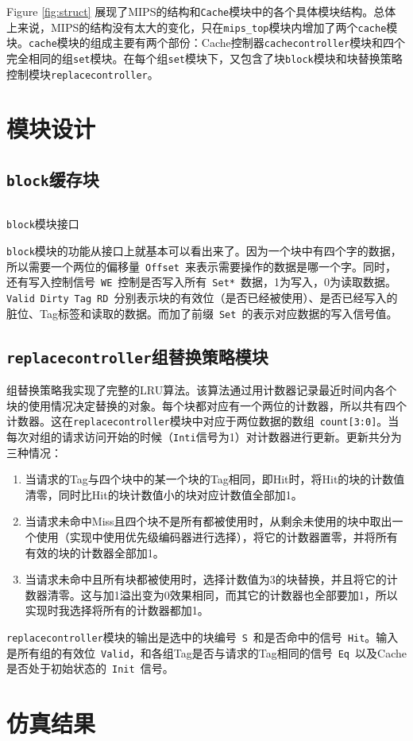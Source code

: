 \documentclass[12pt,a4paper]{article}
\newcommand{\incode}[1]{\texttt{#1}} %
\newcommand{\codefile}[1]{\inputminted[bgcolor=bg,linenos,tabsize=4]{verilog}{code/#1}} %
\begin{document}
Figure \ref{fig:struct} 展现了MIPS的结构和\incode{Cache}模块中的各个具体模块结构。总体上来说，MIPS的结构没有太大的变化，只在\incode{mips_top}模块内增加了两个\incode{cache}模块。\incode{cache}模块的组成主要有两个部份：Cache控制器\incode{cachecontroller}模块和四个完全相同的组\incode{set}模块。在每个组\incode{set}模块下，又包含了块\incode{block}模块和块替换策略控制模块\incode{replacecontroller}。

\section{模块设计}

\subsection{\incode{block}缓存块}

\begin{listing}[h]
	\codefile{block.v}
	\caption{\incode{block}模块接口}
	\label{code:block}
\end{listing}

\incode{block}模块的功能从接口上就基本可以看出来了。因为一个块中有四个字的数据，所以需要一个两位的偏移量\ \incode{Offset}\ 来表示需要操作的数据是哪一个字。同时，还有写入控制信号\ \incode{WE}\ 控制是否写入所有\ \incode{Set*}\ 数据，1为写入，0为读取数据。\incode{Valid}\ \incode{Dirty}\ \incode{Tag}\ \incode{RD}\ 分别表示块的有效位（是否已经被使用）、是否已经写入的脏位、Tag标签和读取的数据。而加了前缀\ \incode{Set}\ 的表示对应数据的写入信号值。

\subsection{\incode{replacecontroller}组替换策略模块}

组替换策略我实现了完整的LRU算法。该算法通过用计数器记录最近时间内各个块的使用情况决定替换的对象。每个块都对应有一个两位的计数器，所以共有四个计数器。这在\incode{replacecontroller}模块中对应于两位数据的数组\ \incode{count[3:0]}。当每次对组的请求访问开始的时候（\incode{Inti}信号为1）对计数器进行更新。更新共分为三种情况：
\begin{enumerate}
  \item 当请求的Tag与四个块中的某一个块的Tag相同，即Hit时，将Hit的块的计数值清零，同时比Hit的块计数值小的块对应计数值全部加1。
  \item 当请求未命中Miss且四个块不是所有都被使用时，从剩余未使用的块中取出一个使用（实现中使用优先级编码器进行选择），将它的计数器置零，并将所有有效的块的计数器全部加1。
  \item 当请求未命中且所有块都被使用时，选择计数值为3的块替换，并且将它的计数器清零。这与加1溢出变为0效果相同，而其它的计数器也全部要加1，所以实现时我选择将所有的计数器都加1。
\end{enumerate}

\incode{replacecontroller}模块的输出是选中的块编号\ \incode{S}\ 和是否命中的信号\ \incode{Hit}。输入是所有组的有效位\ \incode{Valid}，和各组Tag是否与请求的Tag相同的信号\ \incode{Eq}\ 以及Cache是否处于初始状态的\ \incode{Init}\ 信号。

\section{仿真结果}
\end{document}
